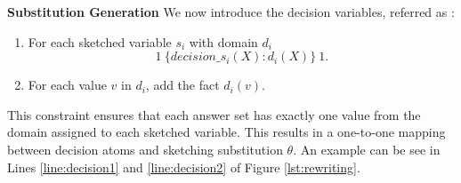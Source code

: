 
\vspace{3pt}
\textbf{Substitution Generation} 
We now introduce the decision variables, referred as \metad:
\begin{enumerate}
\item
For each sketched variable $s_i$ with domain $d_i$ 
$$1~\{ \textit{decision}\_s_i(X) : d_i(X) \}~1 .$$ 
\item 
For each value $v$ in $d_i$, add the fact $d_i(v)$.
\end{enumerate}
This constraint ensures that each answer set has exactly one value from the domain assigned
to each sketched variable. %
This results in a one-to-one mapping between decision atoms and sketching substitution $\theta$. An example can be see in Lines \ref{line:decision1} and \ref{line:decision2} of Figure \ref{lst:rewriting}.


